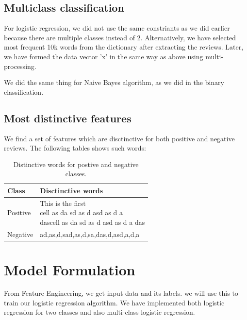 \documentclass{article}
\begin{document}
\subsection{Multiclass classification}

For logistic regression, we did not use the same constriants as we did earlier because there are multiple classes instead of 2. Alternatively, we have selected most frequent 10k words from the dictionary after extracting the reviews. Later, we have formed the data vector 'x' in the same way as above using multi-processing.   

We did the same thing for Naive Bayes algorithm, as we did in the binary classification.


\subsection{Most distinctive features}
We find a set of features which are disctinctive for both positive and negative reviews. The following tables shows such words:





\begin{table}[H]
\caption{Distinctive words for postive and negative classes.}
\label{sample-table}
\begin{small}
\begin{sc}
\begin{adjustbox}{width=0.5\textwidth}
\begin{tabular}{l|l}
\hline
Class &  Disctinctive words\\
\hline
Positive  &  \pbox{20cm}{This is the first \\ cell as da sd as d asd as d a \\dascell as da sd as d asd as d a das}\\
\hline
Negative  &  ad,as,d,sad,as,d,sa,das,d,asd,a,d,a\\
\hline
\end{tabular}
\end{adjustbox}
\end{sc}
\end{small}
\end{table}



\section{Model Formulation}
From Feature Engineering, we get input data and its labels. we will use this to train our logistic regression algorithm. We have implemented both logistic regression for two classes and also multi-class logistic regression.
\end{document}
